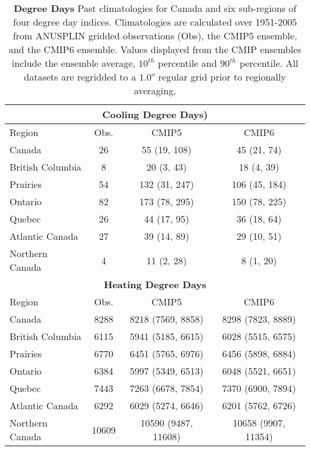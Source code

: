 \documentclass[]{scrartcl}
\begin{document}
\begin{appendices}
\begin{table}[t]
	\caption{\textbf{Degree Days} Past climatologies for Canada and six sub-regions of four degree day indices. Climatologies are calculated over 1951-2005 from ANUSPLIN gridded observations (Obs), the CMIP5 ensemble, and the CMIP6 ensemble. Values displayed from the CMIP ensembles include the ensemble average, $10^{th}$ percentile and $90^{th}$ percentile. All datasets are regridded to a $1.0^o$ regular grid prior to regionally averaging.}\label{table:past_deg_days_compare}
	\begin{center}
		\begin{tabular}{|l|ccc|} 
			\hline
			\multicolumn{4}{|c|}{\textbf{Cooling Degree Days)}} \\
			\hline
			Region & Obs. & CMIP5 & CMIP6   \\
			\hline
			Canada & 26 & 55 (19, 108) & 45 (21, 74) \\ 
			British Columbia & 8 & 20 (3, 43) & 18 (4, 39) \\ 
			Prairies & 54 & 132 (31, 247) & 106 (45, 184) \\ 
			Ontario & 82 & 173 (78, 295) & 150 (78, 225) \\ 
			Quebec & 26 & 44 (17, 95) & 36 (18, 64) \\ 
			Atlantic Canada & 27 & 39 (14, 89) & 29 (10, 51) \\ 
			Northern Canada & 4 & 11 (2, 28) & 8 (1, 20) \\ 
			\hline	
			\multicolumn{4}{|c|}{\textbf{Heating Degree Days}} \\
			\hline
			Region & Obs. & CMIP5 & CMIP6   \\
			\hline
			Canada & 8288 & 8218 (7569, 8858) & 8298 (7823, 8889) \\ 
			British Columbia & 6115 & 5941 (5185, 6615) & 6028 (5515, 6575) \\ 
			Prairies & 6770 & 6451 (5765, 6976) & 6456 (5898, 6884) \\ 
			Ontario & 6384 & 5997 (5349, 6513) & 6048 (5521, 6651) \\ 
			Quebec & 7443 & 7263 (6678, 7854) & 7370 (6900, 7894) \\ 
			Atlantic Canada & 6292 & 6029 (5274, 6646) & 6201 (5762, 6726) \\ 
			Northern Canada & 10609 & 10590 (9487, 11608) & 10658 (9907, 11354) \\ 

\end{tabular}
\end{center}
\end{table}
\end{appendices}
\end{document}
